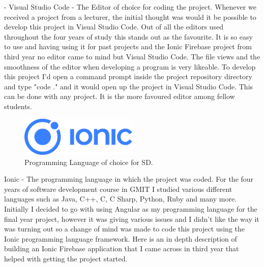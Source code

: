- Visual Studio Code - The Editor of choice for coding the project.
\newline
Whenever we received a project from a lecturer, the initial thought was would it be possible to develop this project in Visual Studio Code. Out of all the editors used throughout the four years of study this stands out as the favourite. It is so easy to use and having using it for past projects and the Ionic Firebase project from third year no editor came to mind but Visual Studio Code. The file views and the smoothness of the editor when developing a program is very likeable. To develop this project I'd open a command prompt inside the project repository directory and type "code ." and it would open up the project in Visual Studio Code. This can be done with any project. It is the more favoured editor among fellow students. 
\newline

\begin{figure}[h!]
	\caption{Programming Language of choice for SD.}
	\label{image:ionic}
	\centering
	\includegraphics[width=0.5\textwidth]{images/ionic.png}
\end{figure}
Ionic - The programming language in which the project was coded. For  the four years of software development course in GMIT I studied various different languages such as Java, C++, C, C Sharp, Python, Ruby and many more. Initially I decided to go with using Angular as my programming language for the final year project, however it was giving various issues and I didn't like the way it was turning out so a change of mind was made to code this project using the Ionic programming language framework. \cite{cheng2018build} Here is an in depth description of building an Ionic Firebase application that I came across in third year that helped with getting the project started.
\newline

